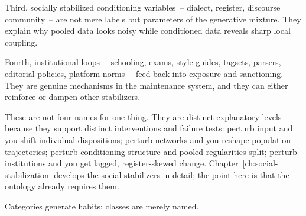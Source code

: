 Third, socially stabilized conditioning variables~-- dialect, register, discourse community~-- are not mere labels but parameters of the generative mixture. They explain why pooled data looks noisy while conditioned data reveals sharp local coupling.

Fourth, institutional loops~-- schooling, exams, style guides, tagsets, parsers, editorial policies, platform norms~-- feed back into exposure and sanctioning. They are genuine mechanisms in the maintenance system, and they can either reinforce or dampen other stabilizers.

These are not four names for one thing. They are distinct explanatory levels because they support distinct interventions and failure tests: perturb input and you shift individual dispositions; perturb networks and you reshape population trajectories; perturb conditioning structure and pooled regularities split; perturb institutions and you get lagged, register-skewed change. Chapter~\ref{ch:social-stabilization} develops the social stabilizers in detail; the point here is that the ontology already requires them.

Categories generate habits; classes are merely named.
